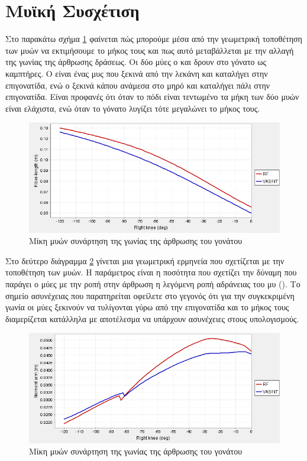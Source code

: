 \section{Μυϊκή Συσχέτιση}

Στο παρακάτω σχήμα \ref{fig:iber-length-vs-knee-angle} φαίνεται πώς μπορούμε μέσα από την γεωμετρική τοποθέτηση των μυών να εκτιμήσουμε το μήκος τους και πως αυτό μεταβάλλεται με την αλλαγή της γωνίας της άρθρωσης δράσεως. Οι δύο μύες ο  και  δρουν στο γόνατο ως καμπτήρες. Ο  είναι ένας μυς που ξεκινά από την λεκάνη και καταλήγει στην επιγονατίδα, ενώ  ο  ξεκινά κάπου ανάμεσα στο μηρό και καταλήγει πάλι στην επιγονατίδα. Είναι προφανές ότι όταν το πόδι είναι τεντωμένο τα μήκη των δύο μυών είναι ελάχιστα, ενώ όταν το γόνατο λυγίζει τότε μεγαλώνει το μήκος τους.

\begin{figure}[H]
    \centering
    \includegraphics[width=0.8\linewidth, keepaspectratio]{fig/fiber-length-vs-knee-angle.png}
    \caption{Μίκη μυών συνάρτηση της γωνίας της άρθρωσης του γονάτου}
    \label{fig:iber-length-vs-knee-angle}
\end{figure}

Στο δεύτερο διάγραμμα \ref{fig:moment-arm-vs-knee-angle} γίνεται μια γεωμετρική ερμηνεία που σχετίζεται με την τοποθέτηση των μυών. Η παράμετρος είναι η ποσότητα που σχετίζει την δύναμη που παράγει ο μύες με την ροπή στην άρθρωση η λεγόμενη ροπή αδράνειας του μυ (). Το σημείο ασυνέχειας που παρατηρείται οφείλετε στο γεγονός ότι για την συγκεκριμένη γωνία οι μύες ξεκινούν να τυλίγονται γύρω από την επιγονατίδα και το μήκος τους διαμερίζεται κατάλληλα με αποτέλεσμα να υπάρχουν ασυνέχειες στους υπολογισμούς.

\begin{figure}[H]
    \centering
    \includegraphics[width=0.8\linewidth, keepaspectratio]{fig/moment-arm-vs-knee-angle.png}
    \caption{Μίκη μυών συνάρτηση της γωνίας της άρθρωσης του γονάτου}
    \label{fig:moment-arm-vs-knee-angle}
\end{figure}

